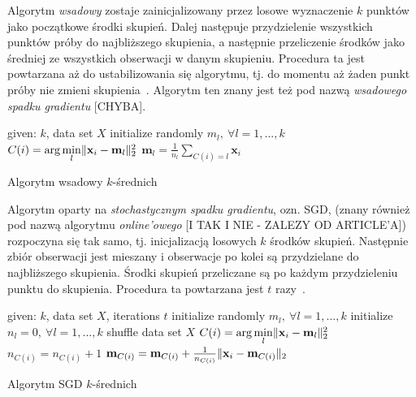 \documentclass{praca1}
\DeclarePairedDelimiter{\norm}{\lVert}{\rVert}
\begin{document}
Algorytm \emph{wsadowy} zostaje zainicjalizowany przez losowe wyznaczenie $k$ punktów jako początkowe środki skupień. Dalej następuje przydzielenie wszystkich punktów próby do najbliższego skupienia, a następnie przeliczenie środków jako średniej ze wszystkich obserwacji w danym skupieniu. Procedura ta jest powtarzana aż do ustabilizowania się algorytmu, tj. do momentu aż żaden punkt próby nie zmieni skupienia~\cite{Wu2007:topten}. Algorytm ten znany jest też pod nazwą \emph{wsadowego spadku gradientu} [CHYBA].

\begin{algorithm}[!h]
\begin{algorithmic}[1]
		\State given: $k$, data set $X$
        \State initialize randomly $m_l, \ \forall l=1, ..., k$
        \Repeat
                \State $C(i) = \arg \min\limits_{l} \norm{\mathbf{x}_i - \mathbf{m}_l }_2^2 $
            \EndFor
                \State $\mathbf{m}_l = \frac{1}{n_l}\sum\limits_{C(i) = l} \mathbf{x}_i$
            \EndFor

\end{algorithmic}
\caption{Algorytm wsadowy $k$-średnich}\label{alg:001}
\end{algorithm}

Algorytm oparty na \emph{stochastycznym spadku gradientu}, ozn. SGD, (znany również pod nazwą algorytmu \emph{online'owego} [I TAK I NIE - ZALEZY OD ARTICLE'A]) rozpoczyna się tak samo, tj. inicjalizacją losowych $k$ środków skupień. Następnie zbiór obserwacji jest mieszany i obserwacje po kolei są przydzielane do najbliższego skupienia. Środki skupień przeliczane są po każdym przydzieleniu punktu do skupienia. Procedura ta powtarzana jest $t$ razy~\cite{Bottou1995:convergenceproperties}.

\begin{algorithm}[h!]
\begin{algorithmic}[1]
		\State given: $k$, data set $X$, iterations $t$
        \State initialize randomly $m_l, \ \forall l=1, ..., k$
        \State initialize $n_l = 0, \ \forall l=1, ..., k$
        	\State shuffle data set $X$
                \State $C(i) = \arg \min\limits_{l} \norm{\mathbf{x}_i - \mathbf{m}_l }_2^2 $
                \State $n_{C(i)} = n_{C(i)} + 1$
                \State $\mathbf{m}_{C(i)} = \mathbf{m}_{C(i)} + \frac{1}{n_{C(i)}}\norm{\mathbf{x}_i - \mathbf{m}_{C(i)}}_2$
            \EndFor
       \EndFor
\end{algorithmic}
\caption{Algorytm SGD $k$-średnich}\label{alg:002}
\end{algorithm}
\end{document}
